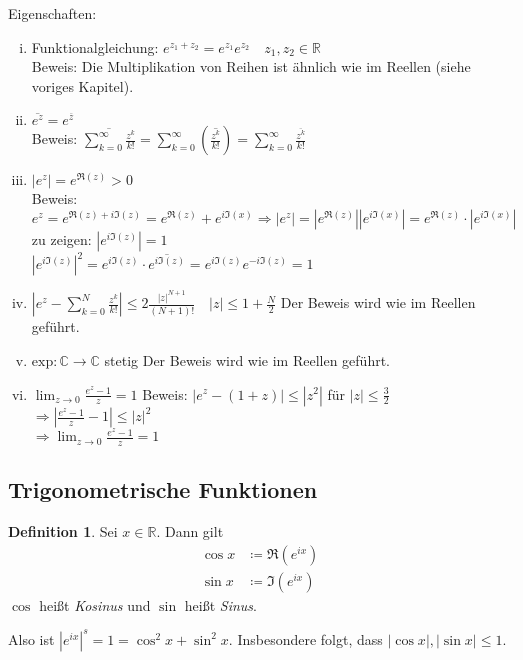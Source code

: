 \documentclass[ngerman,titlepage,twoside, parskip=half*]{scrreprt}
\newcommand*{\R}{\mathbb{R}}
\newcommand*{\C}{\mathbb{C}}
\theoremstyle{plain}
\theoremstyle{definition}
\newtheorem{definition}{Definition}
\theoremstyle{remark}
\begin{document}
Eigenschaften:
\begin{enumerate}[(i)]
  \item Funktionalgleichung: $e^{z_1+z_2}=e^{z_1}e^{z_2}\quad z_1,z_2\in\R$\\
    Beweis: Die Multiplikation von Reihen ist ähnlich wie im Reellen (siehe voriges Kapitel).
  \item $\overline{e^z}=e^{\overline{z}}$\\
    Beweis: $\overline{\sum_{k=0}^\infty \frac{z^k}{k!}}=\sum_{k=0}^\infty (\overline{\frac{z^k}{k!}})=
    \sum_{k=0}^\infty \frac{\overline{z^k}}{k!}$
  \item $|e^z|=e^{\Re (z)}>0$\\
    Beweis: $e^z=e^{\Re (z)+i\Im (z)}=e^{\Re (z)}+e^{i\Im (x)}\Rightarrow |e^z|=|e^{\Re (z)}||e^{i\Im (x)}|
    =e^{\Re (z)}\cdot |e^{i\Im (x)}|$\\
    zu zeigen: $|e^{i\Im (z)}|=1$\\
    $|e^{i\Im (z)}|^2=e^{i\Im (z)}\cdot \overline{e^{i\Im (z)}}=e^{i\Im (z)}e^{-i\Im (z)}=1$
  \item $|e^z-\sum_{k=0}^N \frac{z^k}{k!}|\leq 2\frac{|z|^{N+1}}{(N+1)!}\quad |z|\leq 1+\frac{N}{2}$
    Der Beweis wird wie im Reellen geführt.
  \item $\text{exp}\colon\C\rightarrow\C$ stetig
    Der Beweis wird wie im Reellen geführt.
  \item $\lim_{z\rightarrow 0}\frac{e^z-1}{z}=1$
    Beweis: $|e^z-(1+z)|\leq |z^2|$ für $|z|\leq \frac{3}{2}$\\
    $\Rightarrow |\frac{e^z-1}{z}-1|\leq |z|^2$\\
    $\Rightarrow \lim_{z\rightarrow 0}\frac{{e^z}-1}{z}=1$
\end{enumerate}

\subsection{Trigonometrische Funktionen}
\begin{definition}
Sei $x\in\R$. Dann gilt
\begin{align*}
\cos x & \coloneqq \Re (e^{ix})\\
\sin x & \coloneqq \Im (e^{ix})
\end{align*}
$\cos$ heißt \emph{Kosinus} und $\sin$ heißt \emph{Sinus}.
\end{definition}

Also ist $|e^{ix}|^s=1=\cos^2 x+\sin^2 x$. Insbesondere folgt, dass $|\cos x|, |\sin x|\leq 1$.
\end{document}
